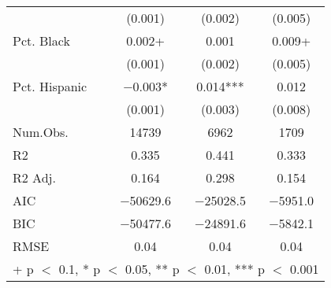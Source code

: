 \documentclass[12pt,english]{article}
\begin{document}
\begin{table*}[p]
\begin{adjustwidth}{-1in}{-1in}
\begin{tabular}[t]{lccc}
 & (\num{0.001}) & (\num{0.002}) & \vphantom{2} (\num{0.005})\\
Pct. Black & \num{0.002}+ & \num{0.001} & \num{0.009}+\\
 & (\num{0.001}) & (\num{0.002}) & \vphantom{1} (\num{0.005})\\
Pct. Hispanic & \num{-0.003}* & \num{0.014}*** & \num{0.012}\\
 & (\num{0.001}) & (\num{0.003}) & (\num{0.008})\\
\midrule
Num.Obs. & \num{14739} & \num{6962} & \num{1709}\\
R2 & \num{0.335} & \num{0.441} & \num{0.333}\\
R2 Adj. & \num{0.164} & \num{0.298} & \num{0.154}\\
AIC & \num{-50629.6} & \num{-25028.5} & \num{-5951.0}\\
BIC & \num{-50477.6} & \num{-24891.6} & \num{-5842.1}\\
RMSE & \num{0.04} & \num{0.04} & \num{0.04}\\
\bottomrule
\multicolumn{4}{l}{\rule{0pt}{1em}+ p $<$ 0.1, * p $<$ 0.05, ** p $<$ 0.01, *** p $<$ 0.001}\\
\end{tabular}
\end{adjustwidth}
\end{table*}
\end{document}

